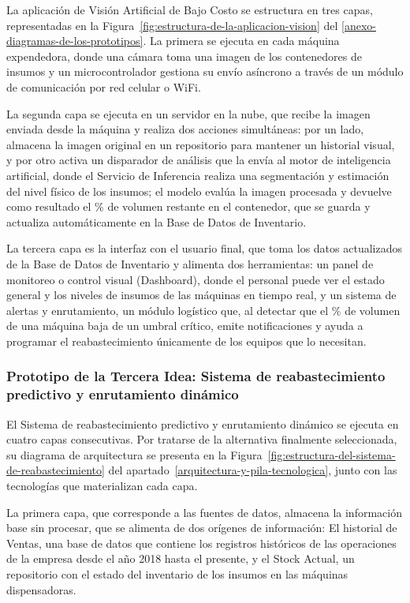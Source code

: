 La aplicación de Visión Artificial de Bajo Costo se estructura en tres capas, representadas en la Figura~\ref{fig:estructura-de-la-aplicacion-vision} del \ref{anexo-diagramas-de-los-prototipos}. La primera se ejecuta en cada máquina expendedora, donde una cámara toma una imagen de los contenedores de insumos y un microcontrolador gestiona su envío asíncrono a través de un módulo de comunicación por red celular o WiFi.

La segunda capa se ejecuta en un servidor en la nube, que recibe la imagen enviada desde la máquina y realiza dos acciones simultáneas: por un lado, almacena la imagen original en un repositorio para mantener un historial visual, y por otro activa un disparador de análisis que la envía al motor de inteligencia artificial, donde el Servicio de Inferencia realiza una segmentación y estimación del nivel físico de los insumos; el modelo evalúa la imagen procesada y devuelve como resultado el \% de volumen restante en el contenedor, que se guarda y actualiza automáticamente en la Base de Datos de Inventario.

La tercera capa es la interfaz con el usuario final, que toma los datos actualizados de la Base de Datos de Inventario y alimenta dos herramientas: un panel de monitoreo o control visual (Dashboard), donde el personal puede ver el estado general y los niveles de insumos de las máquinas en tiempo real, y un sistema de alertas y enrutamiento, un módulo logístico que, al detectar que el \% de volumen de una máquina baja de un umbral crítico, emite notificaciones y ayuda a programar el reabastecimiento únicamente de los equipos que lo necesitan.

\subsubsection{Prototipo de la Tercera Idea: Sistema de reabastecimiento predictivo y enrutamiento dinámico}\label{prototipo-de-la-tercera-idea-sistema-de-reabastecimiento-predictivo-y-enrutamiento-dinuxe1mico}

El Sistema de reabastecimiento predictivo y enrutamiento dinámico se ejecuta en cuatro capas consecutivas. Por tratarse de la alternativa finalmente seleccionada, su diagrama de arquitectura se presenta en la Figura~\ref{fig:estructura-del-sistema-de-reabastecimiento} del apartado~\ref{arquitectura-y-pila-tecnologica}, junto con las tecnologías que materializan cada capa.

La primera capa, que corresponde a las fuentes de datos, almacena la información base sin procesar, que se alimenta de dos orígenes de información: El historial de Ventas, una base de datos que contiene los registros históricos de las operaciones de la empresa desde el año 2018 hasta el presente, y el Stock Actual, un repositorio con el estado del inventario de los insumos en las máquinas dispensadoras.


